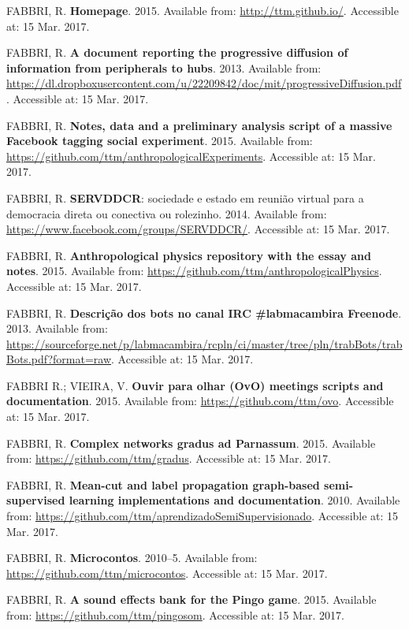 \documentclass[
12pt,		%
openright,	%
twoside,  %
a4paper,			%
chapter=TITLE,		%
english,			%
french,				%
spanish,			%
brazil				%
]{USPSC}
\begin{document}
\begin{thebibliography}{999}
	FABBRI, R. \textbf{Homepage}. 2015.  Available from: \url{http://ttm.github.io/}. Accessible at: 15 Mar. 2017.

	FABBRI, R. \textbf{A document reporting the progressive diffusion of information from peripherals to hubs}. 2013. Available from: \url{https://dl.dropboxusercontent.com/u/22209842/doc/mit/progressiveDiffusion.pdf}. Accessible at: 15 Mar. 2017.

	FABBRI, R. \textbf{Notes, data and a preliminary analysis script of a massive Facebook tagging social experiment}. 2015. Available from: \url{https://github.com/ttm/anthropologicalExperiments}. Accessible at: 15 Mar. 2017.

	FABBRI, R. \textbf{SERVDDCR}: sociedade e estado em reunião virtual para a democracia direta ou conectiva ou rolezinho. 2014. Available from: \url{https://www.facebook.com/groups/SERVDDCR/}. Accessible at: 15 Mar. 2017.

	FABBRI, R. \textbf{Anthropological physics repository with the essay and notes}. 2015. Available from: \url{https://github.com/ttm/anthropologicalPhysics}. Accessible at: 15 Mar. 2017.

	FABBRI, R. \textbf{Descrição dos bots no canal IRC \#labmacambira \@ Freenode}. 2013. Available from: \url{https://sourceforge.net/p/labmacambira/rcpln/ci/master/tree/pln/trabBots/trabBots.pdf?format=raw}. Accessible at: 15 Mar. 2017.

	FABBRI R.; VIEIRA, V. \textbf{Ouvir para olhar (OvO) meetings scripts and documentation}. 2015. Available from: \url{https://github.com/ttm/ovo}. Accessible at: 15 Mar. 2017.

	FABBRI, R. \textbf{Complex networks gradus ad Parnassum}. 2015. Available from: \url{https://github.com/ttm/gradus}. Accessible at: 15 Mar. 2017.

	FABBRI, R. \textbf{Mean-cut and label propagation graph-based semi-supervised learning implementations and documentation}. 2010. Available from: \url{https://github.com/ttm/aprendizadoSemiSupervisionado}. Accessible at: 15 Mar. 2017.

	FABBRI, R. \textbf{Microcontos}. 2010–5. Available from: \url{https://github.com/ttm/microcontos}. Accessible at: 15 Mar. 2017.

	FABBRI, R. \textbf{A sound effects bank for the Pingo game}. 2015. Available from: \url{https://github.com/ttm/pingosom}. Accessible at: 15 Mar. 2017.


\end{thebibliography}
\end{document}
